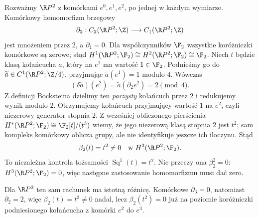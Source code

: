 \begin{przyklad}
\label{prz:bockstein-rp2-komorki-v8}
Rozważmy $\R P^2$ z komórkami
$e^0,e^1,e^2$, po jednej w każdym wymiarze.
Komórkowy homomorfizm brzegowy
\[
 \partial_2:C_2(\R P^2;\Z)\longrightarrow C_1(\R P^2;\Z)
\]
jest mnożeniem przez $2$, a $\partial_1=0$.
Dla współczynników $\F_2$ wszystkie koróżniczki
komórkowe są zerowe; stąd
$H^1(\R P^2;\F_2)\cong H^2(\R P^2;\F_2)
\cong\F_2$.
Niech $t$ będzie klasą kołańcucha $a$, który
na $e^1$ ma wartość $1\in\F_2$.
Podnieśmy go do $\widetilde a\in C^1(\R P^2;\Z/4)$,
przyjmując $\widetilde a(e^1)=1$ modulo $4$.
Wówczas
\[
 (\delta\widetilde a)(e^2)
 =\widetilde a(\partial_2e^2)=2\pmod4.
\]
Z definicji Bocksteina dzielimy ten \emph{parzysty}
kołańcuch przez $2$ i redukujemy wynik modulo $2$.
Otrzymujemy kołańcuch przyjmujący wartość $1$
na $e^2$, czyli niezerowy generator stopnia $2$.
Z wcześniej obliczonego pierścienia
$H^*(\R P^2;\F_2)\cong\F_2[t]/(t^3)$
wiemy, że jego niezerową klasą stopnia $2$
jest $t^2$; sam kompleks komórkowy oblicza
grupy, ale nie identyfikuje jeszcze ich iloczynu.
Stąd
\[
 \beta_2(t)=t^2\ne0
 \quad\text{w }H^2(\R P^2;\F_2).
\]
To niezależna kontrola tożsamości
$\operatorname{Sq}^1(t)=t^2$.
Nie przeczy ona $\beta_2^2=0$:
$H^3(\R P^2;\F_2)=0$, więc następne
zastosowanie homomorfizmu musi dać zero.

Dla $\R P^3$ ten sam rachunek ma istotną różnicę.
Komórkowe $\partial_3=0$, natomiast $\partial_2=2$,
więc $\beta_2(t)=t^2\ne0$ nadal, lecz
$\beta_2(t^2)=0$ już na poziomie
koróżniczki podniesionego kołańcucha
z komórki $e^2$ do $e^3$.
\end{przyklad}

